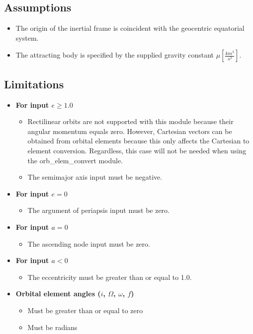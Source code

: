 \subsection{Assumptions}
\begin{itemize}
	\item The origin of the inertial frame is coincident with the geocentric equatorial system.
	\item The attracting body is specified by the supplied gravity constant $\mu [\frac{km^3}{s^2}]$.
\end{itemize}
\subsection{Limitations}
\begin{itemize}
	\item \textbf{\boldmath For input $e \geq 1.0$}
	\begin{itemize}
		\item Rectilinear orbits are not supported with this module because their angular momentum equals zero. However, Cartesian vectors can be obtained from orbital elements because this only affects the Cartesian to element conversion. Regardless, this case will not be needed when using the orb\_elem\_convert module.
		\item The semimajor axis input must be negative.
	\end{itemize}
	\item \textbf{\boldmath For input $e = 0$}
	\begin{itemize}
		\item The argument of periapsis input must be zero.
	\end{itemize}
	\item \textbf{\boldmath For input $a = 0$}
	\begin{itemize}
		\item The ascending node input must be zero.
	\end{itemize}
	\item \textbf{\boldmath For input $a<0$}
	\begin{itemize}
		\item The eccentricity must be greater than or equal to 1.0.
	\end{itemize}
	\item \textbf{Orbital element angles ($i$, $\Omega$, $\omega$, $f$)}
	\begin{itemize}
		\item Must be greater than or equal to zero
		\item Must be radians
	\end{itemize} 
\end{itemize}
